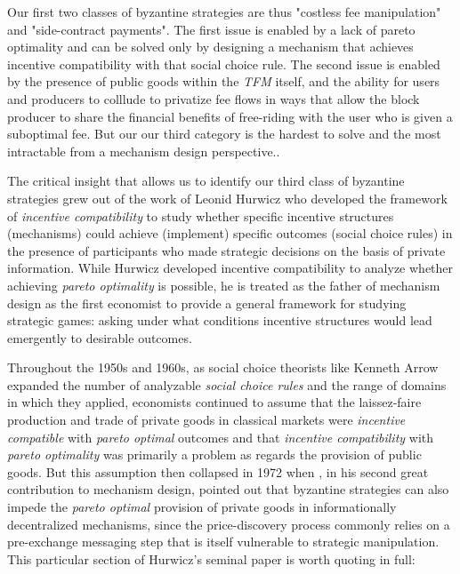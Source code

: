 \documentclass[sigconf,anonymous]{aamas}
\begin{document}
Our first two classes of byzantine strategies are thus "costless fee manipulation" and "side-contract payments". The first issue is enabled by a lack of pareto optimality and can be solved only by designing a mechanism that achieves incentive compatibility with that social choice rule. The second issue is enabled by the presence of public goods within the \textit{TFM} itself, and the ability for users and producers to colllude to privatize fee flows in ways that allow the block producer to share the financial benefits of free-riding with the user who is given a suboptimal fee. But our our third category is the hardest to solve and the most intractable from a mechanism design perspective..

The critical insight that allows us to identify our third class of byzantine strategies grew out of the work of Leonid Hurwicz who developed the framework of \textit{incentive compatibility} to study whether specific incentive structures (mechanisms) could achieve (implement) specific outcomes (social choice rules) in the presence of participants who made strategic decisions on the basis of private information. While Hurwicz developed incentive compatibility to analyze whether achieving \textit{pareto optimality} is possible, he is treated as the father of mechanism design as the first economist to provide a general framework for studying strategic games: asking under what conditions incentive structures would lead emergently to desirable outcomes.

Throughout the 1950s and 1960s, as social choice theorists like Kenneth Arrow expanded the number of analyzable \textit{social choice rules} and the range of domains in which they applied, economists continued to assume that the laissez-faire production and trade of private goods in classical markets were \textit{incentive compatible} with \textit{pareto optimal} outcomes and that \textit{incentive compatibility} with \textit{pareto optimality} was primarily a problem as regards the provision of public goods. But this assumption then collapsed in 1972 when \citet{hurwicz1973design}, in his second great contribution to mechanism design, pointed out that byzantine strategies can also impede the \textit{pareto optimal} provision of private goods in informationally decentralized mechanisms, since the price-discovery process commonly relies on a pre-exchange messaging step that is itself vulnerable to strategic manipulation. This particular section of Hurwicz's seminal paper is worth quoting in full:
\end{document}

